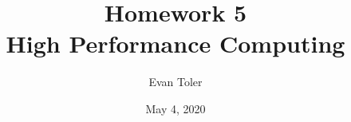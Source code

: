 



\author{Evan Toler}
\date{May 4, 2020}
\title{Homework 5 \\ High Performance Computing}


\maketitle






